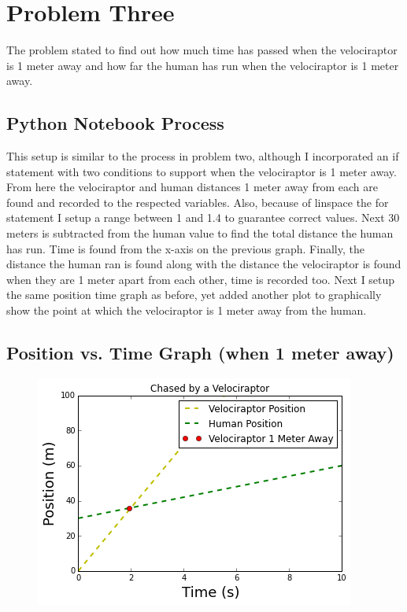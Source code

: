 \documentclass[twocolumn]{revtex4}
\begin{document}
\section{Problem Three}
The problem stated to find out how much time has passed when the velociraptor is 1 meter away and how far the human has run when the velociraptor is 1 meter away.
\subsection{Python Notebook Process}
This setup is similar to the process in problem two, although I incorporated an if statement with two conditions to support when the velociraptor is 1 meter away. From here the velociraptor and human distances 1 meter away from each are found and recorded to the respected variables. Also, because of linspace the for statement I setup a range between 1 and 1.4 to guarantee correct values. Next 30 meters is subtracted from the human value to find the total distance the human has run. Time is found from the x-axis on the previous graph. Finally, the distance the human ran is found along with the distance the velociraptor is found when they are 1 meter apart from each other, time is recorded too. Next I setup the same position time graph as before, yet added another plot to graphically show the point at which the velociraptor is 1 meter away from the human. 
\subsection{Position vs. Time Graph (when 1 meter away)}
\begin{figure}[ht]
\begin{center}
\includegraphics[scale=0.5]{Problem3_GraphImage.png}
\end{center}
\end{figure}
\end{document}
